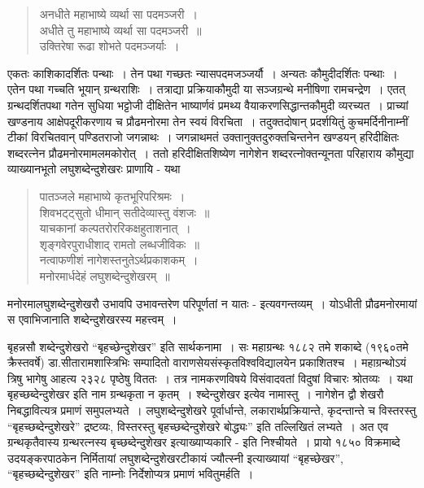 {\begin{verse}
अनधीते महाभाष्ये व्यर्था सा पदमञ्जरी~। \\
अधीते तु महाभाष्ये व्यर्था सा पदमञ्जरी~॥\\
उक्तिरेषा रूढा शोभते पदमञ्जर्याः~। 
\end{verse}

एकतः काशिकादर्शितः पन्थाः~। तेन पथा गच्छतः न्यासपदमजञ्जर्यौ~। अन्यतः कौमुदीदर्शितः पन्थाः~। एतेन पथा गच्चति भूयान् ग्रन्थराशिः~। तत्राद्या प्रक्रियाकौमुदी या सञ्जग्रन्थे मनीषिणा रामचन्द्रेण~। एतत् ग्रन्थदर्शितपथा गतेन सुधिया भट्टोजी दीक्षितेन भाष्यार्णवं प्रमथ्य वैयाकरणसिद्धान्तकौमुदी व्यरच्यत~। प्राच्यां खण्डनाय आक्षेपदूरीकरणाय च प्रौढमनोरमा तेन स्वयं विरचिता~। तदुक्तदोषान् प्रदर्शयितुं कुचमर्दिनीनाम्नीं टीकां विरचितवान् पण्डितराजो जगन्नाथः~। जगन्नाथमतं उक्तानुक्तदुरुक्तचिन्तनेन खण्डयन् हरिदीक्षितः शब्दरत्नेन प्रौढमनोरमामलमकोरोत्~। ततो हरिदीक्षितशिष्येण नागेशेन शब्दरत्नोक्तन्यूनता परिहाराय कौमुद्या व्याख्यानभूतो लघुशब्देन्दुशेखरः प्राणायि - यथा 

\begin{verse}
पातञ्जले महाभाष्ये कृतभूरिपरिश्रमः~। \\
शिवभट्ट्सुतो धीमान् सतीदेव्यास्तु वंशजः~॥\\
याचकानां कल्पतरोररिकक्षहुताशनात्~। \\
शृङ्गवेरपुराधीशाद् रामतो लब्धजीविकः~॥\\
नत्वाफणीशं नागेशस्तनुतेऽर्थप्रकाशकम्~। \\
मनोरमार्धदेहं लघुशब्देन्दुशेखरम्~॥
\end{verse}

मनोरमालघुशब्देन्दुशेखरौ उभावपि उभावन्तरेण परिपूर्णतां न यातः - इत्यवगन्तव्यम्~। योऽधीती प्रौढमनोरमायां स एवाभिजानाति शब्देन्दुशेखरस्य महत्त्वम्~। 

बृहन्नसौ शब्देन्दुशेखरो “बृहच्छेन्दुशेखर” इति सार्थकनामा~। सः महाग्रन्थः १८८२ तमे शकाब्दे (१९६०तमे क्रैस्तवर्षे) डा.सीतारामशास्त्रिभिः सम्पादितो वाराणसेयसंस्कृत\-विश्वविद्यालयेन प्रकाशितश्च~। महाग्रन्थोऽयं त्रिषु भागेषु आहत्य २३२८ पृष्ठेषु विततः~। तत्र नामकरणविषये विसंवादवतां विदुषां विचारः श्रोतव्यः~। यथा बृहच्छब्देन्दुशेखर इति नाम ग्रन्थकृता न कृतम्~। श्ब्देन्दुशेखर इत्येव नामास्तु~। नागेशेन द्वौ शेखरौ निबद्धावित्यत्र प्रमाणं समुपलभ्यते~। लघुशब्देन्दुशेखरे पूर्वार्धान्ते, लकारार्थप्रक्रियान्ते, कृदन्तान्ते च विस्तरस्तु “बृहच्छब्देन्दुशेखरे” द्रष्टव्यः, विस्तरस्तु बृहच्छब्देन्दुशेखरे बोद्ध्यः” इति तल्लिखितं लभ्यते~। अत एव ग्रन्थकृतैवास्य ग्रन्थरत्नस्य बृच्छब्देन्दुशेखर इत्याख्याप्यकारि - इति निश्चीयते~। प्रायो १८५० विक्रमाब्दे उदयङ्करपाठकेन निर्मितायां लघुशब्देन्दुशेखरटीकायं ज्यौत्स्नी इत्याख्यायां “बृहच्छेखर”, “बृहच्छब्देन्दुशेखर” इति नाम्नोः निर्देशोप्यत्र प्रमाणं भवितुमर्हति~। 

}
